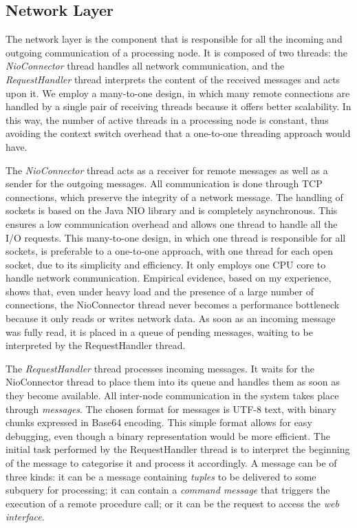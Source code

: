 \subsection*{Network Layer}  
The network layer is the component that is responsible for all the incoming and outgoing communication
of a processing node. 
It is composed of two threads: the \emph{NioConnector} thread handles all
network communication, and the \emph{RequestHandler} thread interprets the content of the received
messages and acts upon it.
We employ a many-to-one design, in which many remote connections are handled by a single pair
of receiving threads because it offers better scalability. In this way, the
number of active threads in a processing node is constant, thus avoiding the context switch overhead that
a one-to-one threading approach would have.

The \emph{NioConnector} thread acts as a receiver for remote messages as well as a sender for the
outgoing messages. All communication is done through TCP connections, which preserve the integrity of a
network message.
The handling of sockets is based on the Java NIO library and is completely asynchronous. This ensures a
low communication overhead and allows one thread to handle all the I/O requests. This many-to-one
design, in which one thread is responsible for all sockets, is preferable to a one-to-one approach,
with one thread for each open socket, due to its simplicity and efficiency. It only employs one CPU
core to handle network communication. Empirical evidence, based on my experience, shows that, even under heavy load and the
presence of a large number of connections, the NioConnector thread never becomes a performance
bottleneck because it only reads or writes network data.
As soon as an incoming message was fully read, it is placed in a queue of pending messages, waiting
to be interpreted by the RequestHandler thread.

The \emph{RequestHandler} thread processes incoming messages. It waits for the
NioConnector thread to place them into its queue and handles them as soon as they become available. All
inter-node communication in the system takes place through \emph{messages}. 
The chosen format for messages is UTF-8 text, with
binary chunks expressed in Base64 encoding. This simple format allows
for easy debugging, even though a binary representation would be more efficient.
The initial task performed by the RequestHandler thread is to interpret the beginning of the message to
categorise it and process it accordingly. A message can be of three kinds: it can be a message
containing \emph{tuples} to be delivered to some subquery for processing; it can contain a \emph{command
message} that triggers the execution of a remote procedure call; or it can be the request to
access the \emph{web interface}.
\vspace{-10pt}
